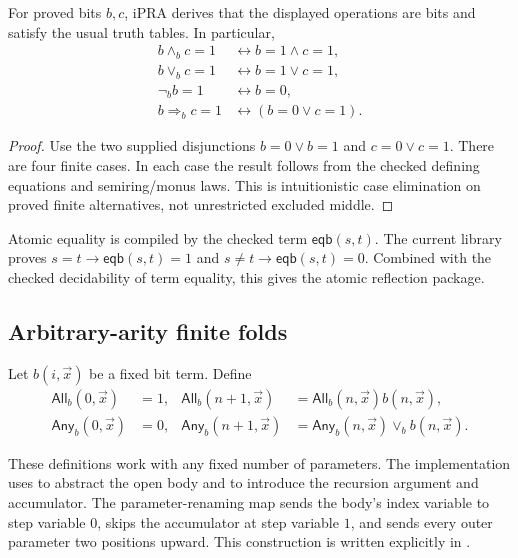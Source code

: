 \begin{lemma}
For proved bits \(b,c\), iPRA derives that the displayed operations are bits and satisfy the usual truth tables.  In particular,
\[
\begin{aligned}
 b\wedge_b c=1 &\leftrightarrow b=1\wedge c=1,\\
 b\vee_b c=1 &\leftrightarrow b=1\vee c=1,\\
 \neg_b b=1 &\leftrightarrow b=0,\\
 b\Rightarrow_b c=1 &\leftrightarrow (b=0\vee c=1).
\end{aligned}
\]
\end{lemma}
\begin{proof}
Use the two supplied disjunctions \(b=0\vee b=1\) and \(c=0\vee c=1\).  There are four finite cases.  In each case the result follows from the checked defining equations and semiring/monus laws.  This is intuitionistic case elimination on proved finite alternatives, not unrestricted excluded middle.
\end{proof}

Atomic equality is compiled by the checked term \(\mathsf{eqb}(s,t)\).  The current library proves \(s=t\to\mathsf{eqb}(s,t)=1\) and \(s\ne t\to\mathsf{eqb}(s,t)=0\).  Combined with the checked decidability of term equality, this gives the atomic reflection package.

\subsection{Arbitrary-arity finite folds}

Let \(b(i,\vec x)\) be a fixed bit term.  Define
\[
\begin{aligned}
\mathsf{All}_b(0,\vec x)&=1,&
\mathsf{All}_b(n+1,\vec x)&=\mathsf{All}_b(n,\vec x)b(n,\vec x),\\
\mathsf{Any}_b(0,\vec x)&=0,&
\mathsf{Any}_b(n+1,\vec x)&=\mathsf{Any}_b(n,\vec x)\vee_b b(n,\vec x).
\end{aligned}
\]

These definitions work with any fixed number of parameters.  The implementation uses  to abstract the open body and  to introduce the recursion argument and accumulator.  The parameter-renaming map sends the body's index variable to step variable \(0\), skips the accumulator at step variable \(1\), and sends every outer parameter two positions upward.  This construction is written explicitly in .

